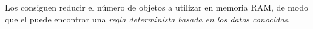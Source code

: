 
Los \catalogos consiguen reducir el número de objetos a utilizar en memoria RAM, de modo que el \clasificador puede encontrar una \emph{regla determinista basada en los datos conocidos}.
